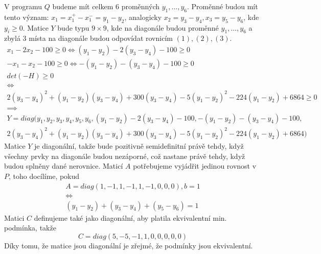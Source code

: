 \documentclass[12pt, a4paper]{article}
\begin{document}
V programu $Q$ budeme mít celkem 6 proměnných $y_1, \dots, y_6$. Proměnné budou mít tento význam: $x_1 = x_1^+ - x_1^- = y_1 - y_2$, analogicky $x_2 = y_3 - y_4, x_3 = y_5 - y_6$, kde $y_i \geq 0$. Matice $Y$ bude typu $9 \times 9$, kde na diagonále budou proměnné $y_1,\dots, y_6$ a zbylá 3 místa na diagonále budou odpovídat rovnicím $(1),(2),(3)$.
\begin{gather*}
x_1-2x_2-100 \geq 0 \iff (y_1-y_2) - 2(y_3-y_4)-100 \geq 0\\
-x_1-x_2-100 \geq 0 \iff -(y_1-y_2) -(y_3-y_4)-100 \geq 0\\
det(-H) \geq 0\\
\iff \\
2(y_3-y_4)^2 + (y_1-y_2)(y_3-y_4) + 300(y_3-y_4) -5(y_1-y_2)^2 - 224(y_1-y_2)+6864 \geq 0\\
\implies \\
Y = diag(y_1, y_2, y_3, y_4, y_5, y_6, (y_1-y_2) - 2(y_3-y_4)-100,  -(y_1-y_2) -(y_3-y_4)-100, \\
2(y_3-y_4)^2 + (y_1-y_2)(y_3-y_4) + 300(y_3-y_4) -5(y_1-y_2)^2 - 224(y_1-y_2)+6864)
\end{gather*}
Matice $Y$ je diagonální, takže bude pozitivně semidefinitní právě tehdy, když všechny prvky na diagonále budou nezáporné, což nastane právě tehdy, když budou splněny dané nerovnice.
Maticí $A$ potřebujeme vyjádřit jedinou rovnost v $P$, toho docílíme, pokud
\begin{gather*}
A = diag(1,-1,1,-1,1,-1,0,0,0), b=1\\
\iff\\
(y_1-y_2)+(y_3-y_4)+(y_5-y_6) = 1
\end{gather*}
Matici $C$ definujeme také jako diagonální, aby platila ekvivalentní min. podmínka, takže
\[
C = diag(5,-5,-1,1,0,0,0,0,0)
\]
Díky tomu, že matice jsou diagonální je zřejmé, že podmínky jsou ekvivalentní.
\end{document}
